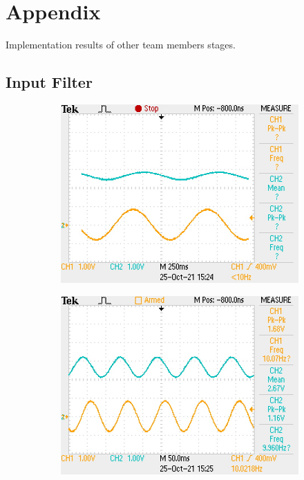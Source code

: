 \documentclass[11pt]{article}
\begin{document}
{\newpage
\section*{Appendix}
Implementation results of other team members stages.
\subsection*{Input Filter}
\begin{figure}[h!]
  \centering
  \begin{subfigure}{0.3\textwidth}
    \includegraphics[width=\columnwidth]{img/testing/input_filter/input_1Hz.JPG}
  \end{subfigure}
  \begin{subfigure}{0.3\textwidth}
    \includegraphics[width=\columnwidth]{img/testing/input_filter/input_10Hz.JPG}

\end{subfigure}
\end{figure}}
\end{document}

